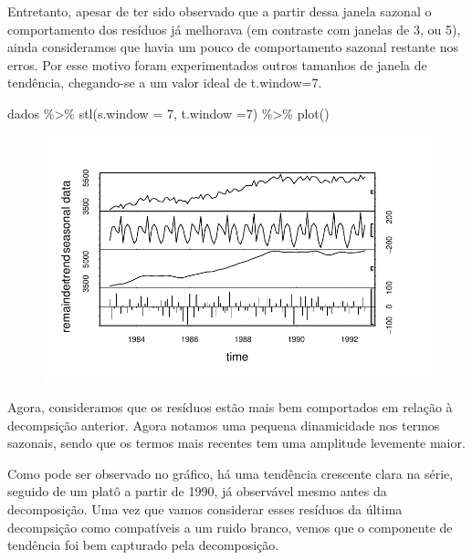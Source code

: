 \documentclass[
  letterpaper,
  DIV=11,
  numbers=noendperiod]{scrartcl}
\newenvironment{Shaded}{\begin{snugshade}}{\end{snugshade}}
\newcommand{\AttributeTok}[1]{\textcolor[rgb]{0.40,0.45,0.13}{#1}}
\newcommand{\DecValTok}[1]{\textcolor[rgb]{0.68,0.00,0.00}{#1}}
\newcommand{\FunctionTok}[1]{\textcolor[rgb]{0.28,0.35,0.67}{#1}}
\newcommand{\NormalTok}[1]{\textcolor[rgb]{0.00,0.23,0.31}{#1}}
\newcommand{\SpecialCharTok}[1]{\textcolor[rgb]{0.37,0.37,0.37}{#1}}
\begin{document}
Entretanto, apesar de ter sido observado que a partir dessa janela
sazonal o comportamento dos resíduos já melhorava (em contraste com
janelas de 3, ou 5), ainda consideramos que havia um pouco de
comportamento sazonal restante nos erros. Por esse motivo foram
experimentados outros tamanhos de janela de tendência, chegando-se a um
valor ideal de t.window=7.

\begin{Shaded}
\begin{Highlighting}[]
\NormalTok{dados }\SpecialCharTok{\%\textgreater{}\%} \FunctionTok{stl}\NormalTok{(}\AttributeTok{s.window =} \DecValTok{7}\NormalTok{, }\AttributeTok{t.window =}\DecValTok{7}\NormalTok{) }\SpecialCharTok{\%\textgreater{}\%}
  \FunctionTok{plot}\NormalTok{()}
\end{Highlighting}
\end{Shaded}

\begin{figure}[H]

{\centering \includegraphics{Trabalhao1_ST_grupo5_2023_05_16_files/figure-pdf/unnamed-chunk-4-1.pdf}

}

\end{figure}

Agora, consideramos que os resíduos estão mais bem comportados em
relação à decompsição anterior. Agora notamos uma pequena dinamicidade
nos termos sazonais, sendo que os termos mais recentes tem uma amplitude
levemente maior.

Como pode ser observado no gráfico, há uma tendência crescente clara na
série, seguido de um platô a partir de 1990, já observável mesmo antes
da decomposição. Uma vez que vamos considerar esses resíduos da última
decompsição como compatíveis a um ruido branco, vemos que o componente
de tendência foi bem capturado pela decomposição.
\end{document}
